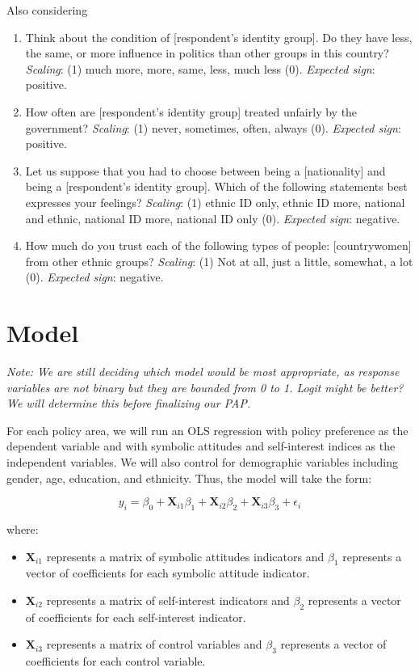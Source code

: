 \documentclass[]{article}
\begin{document}
Also considering

\begin{enumerate}
  \item Think about the condition of [respondent’s identity group]. Do they have less, the same, or more influence in politics than other groups in this country? \textit{Scaling}: (1) much more, more, same, less, much less (0).  \textit{Expected sign}: positive.
  \item How often are [respondent’s identity group] treated unfairly by the government? \textit{Scaling}: (1) never, sometimes, often, always (0).  \textit{Expected sign}: positive.
  \item Let us suppose that you had to choose between being a [nationality] and being a [respondent’s identity group]. Which of the following statements best expresses your feelings? \textit{Scaling}: (1) ethnic ID only, ethnic ID more, national and ethnic, national ID more, national ID only (0).  \textit{Expected sign}: negative.
  \item How much do you trust each of the following types of people: [countrywomen] from other ethnic groups? \textit{Scaling}: (1) Not at all, just a little, somewhat, a lot (0).  \textit{Expected sign}: negative.
\end{enumerate}

\section{Model}\label{model}

\textit{Note: We are still deciding which model would be most appropriate, as response variables are not binary but they are bounded from 0 to 1. Logit might be better? We will determine this before finalizing our PAP.}

For each policy area, we will run an OLS regression with policy
preference as the dependent variable and with symbolic attitudes and
self-interest indices as the independent variables. We will also control
for demographic variables including gender, age, education, and
ethnicity. Thus, the model will take the form:

\begin{equation}
y_i = \beta_0 + \textbf{X}_{i1}\beta_1 + \textbf{X}_{i2}\beta_2 +  \textbf{X}_{i3}\beta_3 + \epsilon_i 
\end{equation}

where:

\begin{itemize}
  \item $\textbf{X}_{i1}$ represents a matrix of symbolic attitudes indicators and $\beta_1$ represents a vector of coefficients for each symbolic attitude indicator.
  \item $\textbf{X}_{i2}$ represents a matrix of self-interest indicators and $\beta_2$ represents a vector of coefficients for each self-interest indicator.
  \item $\textbf{X}_{i3}$ represents a matrix of control variables and $\beta_3$ represents a vector of coefficients for each control variable.
\end{itemize}
\end{document}
